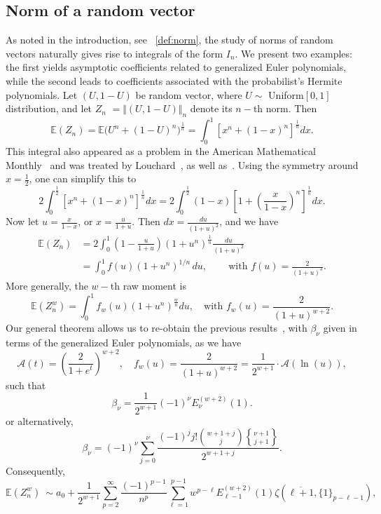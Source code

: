\documentclass[10pt,reqno,a4paper]{amsart}%
\theoremstyle{definition}
\newcommand{\E}{\ensuremath{\mathbb{E}}} %
\newcommand{\ap}{\ensuremath{\mathcal{A}}}%
\begin{document}
\subsection{Norm of a random vector}
As noted in the introduction, see ~\eqref{def:norm}, the study of norms of
random vectors naturally gives rise to integrals of the form $I_{n}$.
We present two examples: the first yields asymptotic coefficients related to
generalized Euler polynomials, while the second leads to coefficients
associated with the probabilist's Hermite polynomials. Let $\left(  U,1-U\right)$ be random vector, where $U\sim$ Uniform$[0,1]$
distribution, and let $Z_{n}$ $=\Vert(U,1-U)\Vert_{n}$ denote its $n-$th
norm. Then
\[
\E(Z_{n})=\mathbb{E}\Big(U^{n}+(1-U)^{n}\Big)^{\frac{1}{n}}=\int
_{0}^{1}[x^{n}+(1-x)^{n}]^{\frac{1}{n}}dx.
\]
This integral also appeared as a problem in the American Mathematical
Monthly~\cite{AMM2016} and was treated by Louchard~\cite{Louchard}, as well
as~\cite{HKLL2020}. Using the symmetry around $x=\frac{1}{2}$, one can
simplify this to
\[
2\int_{0}^{\frac{1}{2}}[x^{n}+(1-x)^{n}]^{\frac{1}{n}}dx=2\int_{0}^{\frac
{1}{2}}(1-x)\left[  1+\left(  \frac{x}{1-x}\right)  ^{n}\right]  ^{\frac{1}%
{n}}dx.
\]
Now let $u=\frac{x}{1-x}$, or $x=\frac{u}{1+u}$. Then $dx=\frac{du}{(1+u)^{2}%
}$, and we have
\begin{align*}
\E(Z_{n})  &  =2\int_{0}^{1}\left(  1-\frac{u}{1+u}\right)
(1+u^{n})^{\frac{1}{n}}\frac{du}{(1+u)^{2}}\\
&  =\int_{0}^{1}f(u)(1+u^{n})^{1/n}\,du,\,\qquad\text{with }f(u)=\frac
{2}{(1+u)^{3}}.
\end{align*}
More generally, the $w-$th raw moment is
\[
\E(Z_{n}^{w})=\int_{0}^{1}f_{w}(u)(1+u^{n})^{\frac{w}{n}}%
du,\quad\text{with }f_{w}(u)=\frac{2}{(1+u)^{w+2}}.
\]
Our general theorem allows us to re-obtain the previous
results~\cite{HKLL2020}, with $\beta_{\nu}$ given in terms of the generalized
Euler polynomials, as we have
\[
\ap(t)=(\frac{2}{1+e^{t}})^{w+2},\quad f_{w}(u)=\frac{2}{(1+u)^{w+2}%
}=\frac{1}{2^{w+1}}\cdot\ap(\ln(u)),
\]
such that
\[
\beta_{\nu}=\frac{1}{2^{w+1}}(-1)^{\nu}E_{\nu}^{(w+2)}(1).
\]
or alternatively,
\begin{equation}
\beta_{\nu}=(-1)^{\nu}\sum_{j=0}^{\nu}\frac{(-1)^{j}j!\binom{w+1+j}{j}%
\genfrac{\{}{\}}{0pt}{}{\nu+1}{j+1}%
}{2^{w+1+j}}. \label{eqn:expansionZ_n2}%
\end{equation}
Consequently,
\begin{equation}
\E(Z_{n}^{w})~\sim a_{0}+\frac{1}{2^{w+1}}\sum_{p=2}^{\infty}%
\frac{(-1)^{p-1}}{n^{p}}\sum_{\ell=1}^{p-1}w^{p-\ell}E_{\ell-1}^{(w+2)}%
(1)\zeta(\overline{\ell+1},\{1\}_{p-\ell-1}), \label{eqn:expansionZ_n}%
\end{equation}
\end{document}
